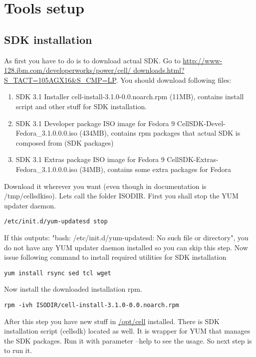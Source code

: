 \chapter{Tools setup}
\label{toolsSetup}

\section{SDK installation}

As first you have to do is to download actual SDK.
Go to \url{http://www-128.ibm.com/developerworks/power/cell/ downloads.html?S_TACT=105AGX16&S_CMP=LP}.
You should download following files:

\begin{enumerate}
\item SDK 3.1 Installer
cell-install-3.1.0-0.0.noarch.rpm  (11MB), contains install script and other stuff for SDK installation.
\item SDK 3.1 Developer package ISO image for Fedora 9
CellSDK-Devel-Fedora\_3.1.0.0.0.iso  (434MB), contains rpm packages that actual SDK is composed from (SDK packages)
\item SDK 3.1 Extras package ISO image for Fedora 9
CellSDK-Extras-Fedora\_3.1.0.0.0.iso  (34MB), contains some extra packages for Fedora
\end{enumerate}

Download it wherever you want (even though in documentation is /tmp/cellsdkiso).
Lets call the folder ISODIR.
First you shall stop the YUM updater daemon.

\begin{verbatim}
/etc/init.d/yum-updatesd stop
\end{verbatim}

If this outputs: "bash: /etc/init.d/yum-updatesd: No such file or directory", you do not have any YUM updater daemon installed so you can skip this step.
Now issue following command to install required utilities for SDK installation

\begin{verbatim}
yum install rsync sed tcl wget
\end{verbatim}

Now install the downloaded installation rpm.

\begin{verbatim}
rpm -ivh ISODIR/cell-install-3.1.0-0.0.noarch.rpm
\end{verbatim}

After this step you have new stuff in \url{/opt/cell} installed. There is SDK installation script (cellsdk) located as well.
It is wrapper for YUM that manages the SDK packages.
Run it with parameter --help to see the usage.
So next step is to run it.

